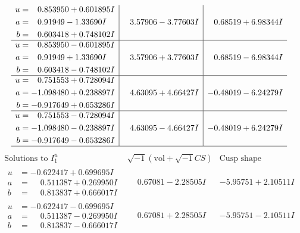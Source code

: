 \documentclass[1p]{elsarticle_modified}
\theoremstyle{definition}
\newcommand{\I}{\sqrt{-1}}
\begin{document}
$$\begin{array}{c|c|c}
\begin{aligned}
u &= \phantom{-}0.853950 + 0.601895 I \\
a &= \phantom{-}0.91949 - 1.33690 I \\
b &= \phantom{-}0.603418 + 0.748102 I\end{aligned}
 & \phantom{-}3.57906 - 3.77603 I & \phantom{-}0.68519 + 6.98344 I \\ \hline\begin{aligned}
u &= \phantom{-}0.853950 - 0.601895 I \\
a &= \phantom{-}0.91949 + 1.33690 I \\
b &= \phantom{-}0.603418 - 0.748102 I\end{aligned}
 & \phantom{-}3.57906 + 3.77603 I & \phantom{-}0.68519 - 6.98344 I \\ \hline\begin{aligned}
u &= \phantom{-}0.751553 + 0.728094 I \\
a &= -1.098480 + 0.238897 I \\
b &= -0.917649 + 0.653286 I\end{aligned}
 & \phantom{-}4.63095 + 4.66427 I & -0.48019 - 6.24279 I \\ \hline\begin{aligned}
u &= \phantom{-}0.751553 - 0.728094 I \\
a &= -1.098480 - 0.238897 I \\
b &= -0.917649 - 0.653286 I\end{aligned}
 & \phantom{-}4.63095 - 4.66427 I & -0.48019 + 6.24279 I\\
 \hline 
 \end{array}$$\newpage$$\begin{array}{c|c|c}  
\text{Solutions to }I^u_{1}& \I (\text{vol} + \sqrt{-1}CS) & \text{Cusp shape}\\
 \hline 
\begin{aligned}
u &= -0.622417 + 0.699695 I \\
a &= \phantom{-}0.511387 + 0.269950 I \\
b &= \phantom{-}0.813837 + 0.666017 I\end{aligned}
 & \phantom{-}0.67081 - 2.28505 I & -5.95751 + 2.10511 I \\ \hline\begin{aligned}
u &= -0.622417 - 0.699695 I \\
a &= \phantom{-}0.511387 - 0.269950 I \\
b &= \phantom{-}0.813837 - 0.666017 I\end{aligned}
 & \phantom{-}0.67081 + 2.28505 I & -5.95751 - 2.10511 I \\ \hline\begin{aligned}

\end{aligned}
\end{array}$$
\end{document}
